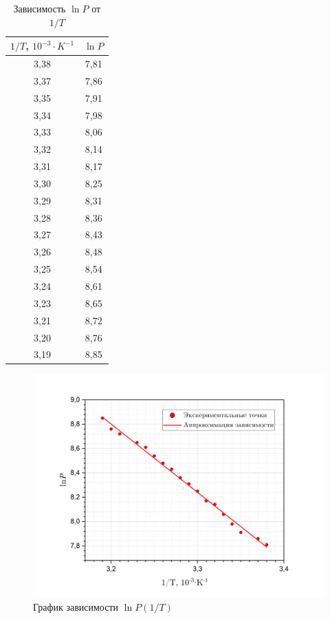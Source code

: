 \documentclass[a4paper, 12pt]{article}
\begin{document}
    \begin{table}[H]
        \centering
            \begin{tabular}{|c|c|}
            \hline
            $1/T$, $10^{-3} \cdot K^{-1}$ & $\ln P$ \\ \hline
            3,38 & 7,81 \\ \hline
            3,37 & 7,86 \\ \hline
            3,35 & 7,91 \\ \hline
            3,34 & 7,98 \\ \hline
            3,33 & 8,06 \\ \hline
            3,32 & 8,14 \\ \hline
            3,31 & 8,17 \\ \hline
            3,30 & 8,25 \\ \hline
            3,29 & 8,31 \\ \hline
            3,28 & 8,36 \\ \hline
            3,27 & 8,43 \\ \hline
            3,26 & 8,48 \\ \hline
            3,25 & 8,54 \\ \hline
            3,24 & 8,61 \\ \hline
            3,23 & 8,65 \\ \hline
            3,21 & 8,72 \\ \hline
            3,20 & 8,76 \\ \hline
            3,19 & 8,85 \\ \hline
            \end{tabular}
        \caption{Зависимость $\ln P$ от $1/T$}
        \label{tab:ln}
    \end{table}

     \begin{figure}[H]
        \centering
        \includegraphics[width = 15cm]{images/lnP.png}
        \caption{График зависимости $\ln P (1/T)$}
        \label{graph2}
    \end{figure}
\end{document}
